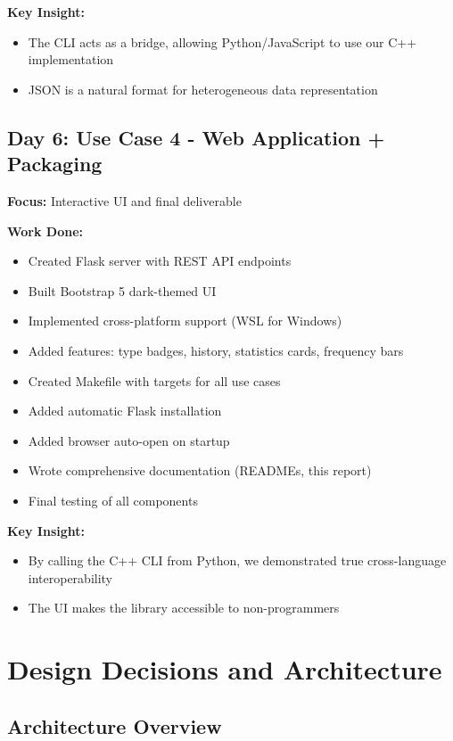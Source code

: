 \documentclass[11pt,a4paper]{article}
\begin{document}
\textbf{Key Insight:}
\begin{itemize}
    \item The CLI acts as a bridge, allowing Python/JavaScript to use our C++ implementation
    \item JSON is a natural format for heterogeneous data representation
\end{itemize}

\subsection{Day 6: Use Case 4 - Web Application + Packaging}

\textbf{Focus:} Interactive UI and final deliverable

\textbf{Work Done:}
\begin{itemize}
    \item Created Flask server with REST API endpoints
    \item Built Bootstrap 5 dark-themed UI
    \item Implemented cross-platform support (WSL for Windows)
    \item Added features: type badges, history, statistics cards, frequency bars
    \item Created Makefile with targets for all use cases
    \item Added automatic Flask installation
    \item Added browser auto-open on startup
    \item Wrote comprehensive documentation (READMEs, this report)
    \item Final testing of all components
\end{itemize}

\textbf{Key Insight:}
\begin{itemize}
    \item By calling the C++ CLI from Python, we demonstrated true cross-language interoperability
    \item The UI makes the library accessible to non-programmers
\end{itemize}

\section{Design Decisions and Architecture}

\subsection{Architecture Overview}
\end{document}
